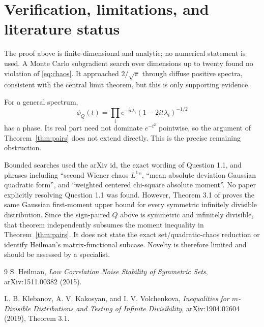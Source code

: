 \documentclass[11pt]{article}
\begin{document}
\section{Verification, limitations, and literature status}

The proof above is finite-dimensional and analytic; no numerical statement
is used.  A Monte Carlo subgradient search over dimensions up to twenty found
no violation of \eqref{eq:chaos}.  It approached $2/\sqrt\pi$ through diffuse
positive spectra, consistent with the central limit theorem, but this is only
supporting evidence.

For a general spectrum,
\[
 \phi_Q(t)=\prod_i e^{-it\lambda_i}(1-2it\lambda_i)^{-1/2}
\]
has a phase.  Its real part need not dominate $e^{-t^2}$ pointwise, so the
argument of Theorem~\ref{thm:pairs} does not extend directly.  This is the
precise remaining obstruction.

Bounded searches used the arXiv id, the exact wording of Question 1.1, and
phrases including ``second Wiener chaos $L^1$'', ``mean absolute deviation
Gaussian quadratic form'', and ``weighted centered chi-square absolute
moment''.  No paper explicitly resolving Question 1.1 was found.  However,
Theorem 3.1 of \cite{Klebanov2019} proves the same Gaussian first-moment upper
bound for every symmetric infinitely divisible distribution.  Since the
sign-paired $Q$ above is symmetric and infinitely divisible, that theorem
independently subsumes the moment inequality in
Theorem~\ref{thm:pairs}.  It does not state the exact set/quadratic-chaos
reduction or identify Heilman's matrix-functional subcase.  Novelty is
therefore limited and should be assessed by a specialist.

\begin{thebibliography}{9}
S. Heilman,
\emph{Low Correlation Noise Stability of Symmetric Sets},
arXiv:1511.00382 (2015).
\par\medskip

L. B. Klebanov, A. V. Kakosyan, and I. V. Volchenkova,
\emph{Inequalities for $m$-Divisible Distributions and Testing of Infinite
Divisibility}, arXiv:1904.07604 (2019), Theorem 3.1.
\end{thebibliography}
\end{document}
